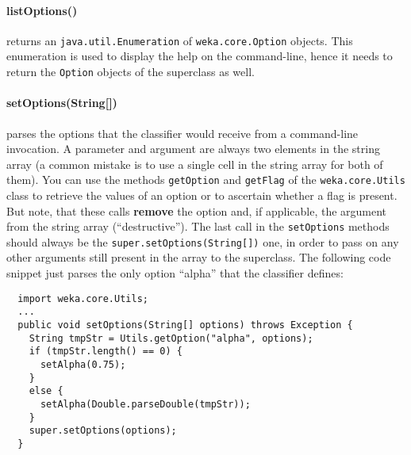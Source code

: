 \paragraph{listOptions()} returns an \texttt{java.util.Enumeration} of
\texttt{weka.core.Option} objects. This enumeration is used to display the help
on the command-line, hence it needs to return the \texttt{Option} objects of
the superclass as well.

\paragraph{setOptions(String[])} parses the options that the classifier
would receive from a command-line invocation. A parameter and argument are
always two elements in the string array (a common mistake is to use a single
cell in the string array for both of them). You can use the methods
\texttt{getOption} and \texttt{getFlag} of the \texttt{weka.core.Utils} class to
retrieve the values of an option or to ascertain whether a flag is present. But
note, that these calls \textbf{remove} the option and, if applicable, the
argument from the string array (``destructive''). The last call in the
\texttt{setOptions} methods should always be the
\texttt{super.setOptions(String[])} one, in order to pass on any other arguments
still present in the array to the superclass. The following code snippet just
parses the only option ``alpha'' that the classifier defines:
\begin{verbatim}
  import weka.core.Utils;
  ...
  public void setOptions(String[] options) throws Exception {
    String tmpStr = Utils.getOption("alpha", options);
    if (tmpStr.length() == 0) {
      setAlpha(0.75);
    }
    else {
      setAlpha(Double.parseDouble(tmpStr));
    }
    super.setOptions(options);
  }
\end{verbatim}

\clearpage

